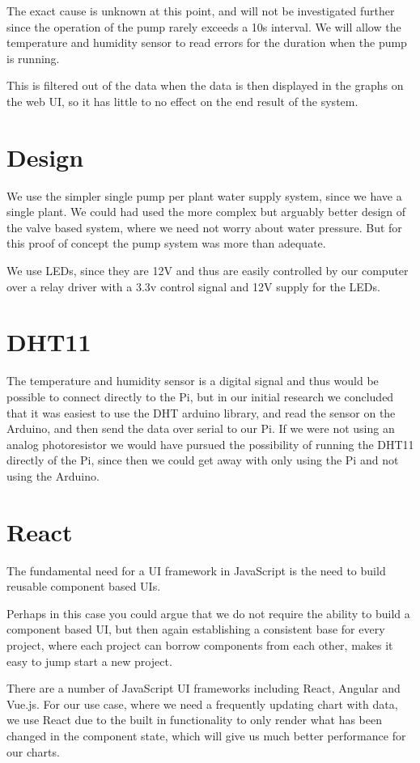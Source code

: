 \documentclass[a4paper,12pt,twoside,openright,titlepage]{book}
\begin{document}
The exact cause is unknown at this point, and will not be investigated further since the operation of the pump rarely exceeds a 10s interval. We will allow the temperature and humidity sensor to read errors for the duration when the pump is running.

This is filtered out of the data when the data is then displayed in the graphs on the web UI, so it has little to no effect on the end result of the system.

\section{Design}
We use the simpler single pump per plant water supply system, since we have a single plant.
We could had used the more complex but arguably better design of the valve based system, where we need not worry about water pressure. But for this proof of concept the pump system was more than adequate.

We use LEDs, since they are 12V and thus are easily controlled by our computer over a relay driver with a 3.3v control signal and 12V supply for the LEDs.

\section{DHT11}
The temperature and humidity sensor is a digital signal and thus would be possible to connect directly to the Pi, but in our initial research we concluded that it was easiest to use the DHT arduino library, and read the sensor on the Arduino, and then send the data over serial to our Pi. If we were not using an analog photoresistor we would have pursued the possibility of running the DHT11 directly of the Pi, since then we could get away with only using the Pi and not using the Arduino.

\section{React}
The fundamental need for a UI framework in JavaScript is the need to build reusable component based UIs.

Perhaps in this case you could argue that we do not require the ability to build a component based UI, but then again establishing a consistent base for every project, where each project can borrow components from each other, makes it easy to jump start a new project.

There are a number of JavaScript UI frameworks including React, Angular and Vue.js.
For our use case, where we need a frequently updating chart with data, we use React due to the built in functionality to only render what has been changed in the component state, which will give us much better performance for our charts.
\end{document}
